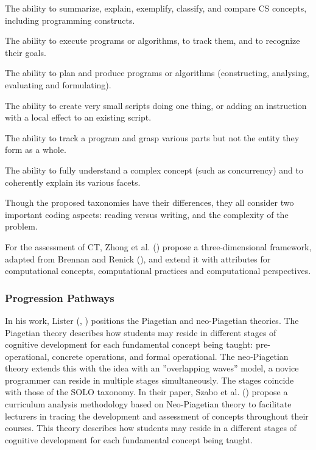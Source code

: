 \begin{description}[leftmargin=1em]
\item[Understanding:] The ability to summarize, explain, exemplify,
    classify, and compare CS concepts, including programming constructs.
\item[Applying:] The ability to execute programs or algorithms, to track
    them, and to recognize their goals.
\item[Creating:] The ability to plan and produce programs or algorithms
    (constructing, analysing, evaluating and formulating).
\item[Unistructural:] The ability to create very small scripts doing one
    thing, or adding an instruction with a local effect to an existing
    script.
\item[Multistructural:] The ability to track a program and grasp various
    parts but not the entity they form as a whole.
\item[Relational:] The ability to fully understand a complex concept (such
    as concurrency) and to coherently explain its various facets.
\end{description}



Though the proposed taxonomies have their differences, they all consider two important coding aspects: reading versus writing, and the complexity of the problem.

For the assessment of CT, Zhong et al. (\cite{Zhong2016}) propose a three-dimensional framework, adapted from Brennan and Renick (\cite{BrennanResnick2012}), and extend it with attributes for computational concepts, computational practices and computational perspectives.


\subsubsection*{Progression Pathways}



In his work, Lister (\cite{lister2010naturally}, \cite{lister2016toward}) positions the Piagetian and neo-Piagetian theories. The Piagetian theory describes how students may reside in different stages of cognitive development for each fundamental concept being taught: pre-operational, concrete operations, and formal operational. The neo-Piagetian theory extends this with the idea with an ”overlapping waves” model, a novice programmer can reside in multiple stages simultaneously. The stages coincide with those of the SOLO taxonomy. In their paper, Szabo et al. (\cite{szabo2014neo}) propose a curriculum analysis methodology based on Neo-Piagetian theory to facilitate lecturers in tracing the development and assessment of concepts throughout their courses. This theory describes how students may reside in a different stages of cognitive development for each fundamental concept being taught.

